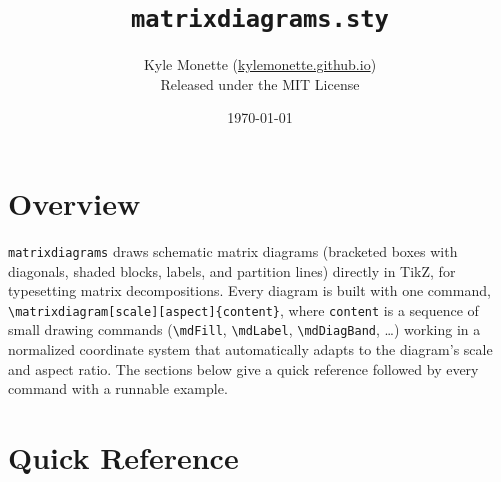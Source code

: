 \documentclass[11pt,english]{article}
\title{\texttt{matrixdiagrams.sty}}
\author{Kyle Monette (\href{https://kylemonette.github.io}{kylemonette.github.io}) \\
  \small Released under the MIT License}
\date{\today}
\begin{document}
\maketitle

\section*{Overview}

\texttt{matrixdiagrams} draws schematic matrix diagrams (bracketed boxes with
diagonals, shaded blocks, labels, and partition lines) directly in TikZ, for
typesetting matrix decompositions.
Every diagram is built with one command,
\verb|\matrixdiagram[scale][aspect]{content}|, where \texttt{content} is a
sequence of small drawing commands (\verb|\mdFill|, \verb|\mdLabel|,
\verb|\mdDiagBand|, \ldots) working in a normalized coordinate system that
automatically adapts to the diagram's scale and aspect ratio. The sections
below give a quick reference followed by every command with a runnable
example.

\section{Quick Reference}
\end{document}
